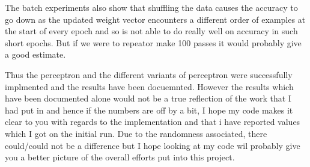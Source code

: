 \documentclass[12pt, fullpage,letterpaper]{article}
\begin{document}
\begin{enumerate}
	The batch experiments also show that shuffling the data causes the accuracy to go down as the updated weight vector encounters a different order of examples at the start of every epoch and so is not able to do really well on accuracy in such short epochs. But if we were to repeator make 100 passes it would probably give a good estimate.
	
	
	Thus the perceptron and the different variants of perceptron were successfully implmented and the results have been docuemnted. However the results which have been documented alone would not be a true reflection of the work that I had put in and hence if the numbers are off by a bit, I hope my code makes it clear to you with regards to the implementation and that i have reported values which I got on the initial run. Due to the randomness associated, there could/could not be a difference but I hope looking at my code wil probably give you a better picture of the overall efforts put into this project. 
			
	\end{enumerate}
	
\end{document}
